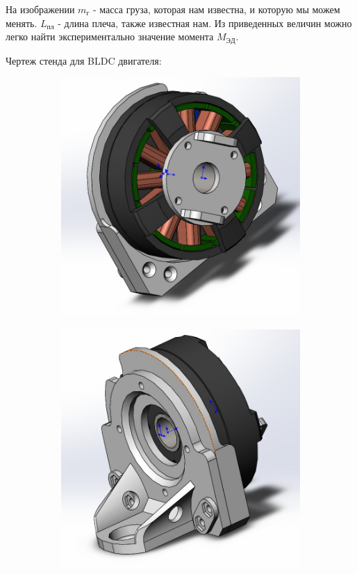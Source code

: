 На изображении $ m_г $ - масса груза, которая нам известна, и которую мы можем менять. $ L_{пл} $ - длина плеча, также известная нам. Из приведенных величин можно легко найти экспериментально значение момента $ M_ {ЭД} $.

Чертеж стенда для BLDC двигателя:

\begin{figure}[ht]
    \centering
    \begin{subfigure}[b]{0.45\textwidth}    
        \centering
        \includegraphics[scale=0.25]{drw1.png}
        \caption{}
    \end{subfigure}
    \begin{subfigure}[b]{0.45\textwidth}
        \centering
        \includegraphics[scale=0.25]{drw2.png}

\end{subfigure}
\end{figure}
